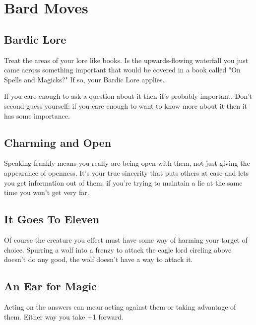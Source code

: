 \chapter{Bard Moves}
   
 
\section{Bardic Lore}    
 

Treat the areas of your lore like books. Is the upwards-flowing waterfall you just came across something important that would be covered in a book called "On Spells and Magicks?" If so, your Bardic Lore applies.

 

If you care enough to ask a question about it then it's probably important. Don't second guess yourself: if you care enough to want to know more about it then it has some importance.

 
\section{Charming and Open}   
 

Speaking frankly means you really are being open with them, not just giving the appearance of openness. It's your true sincerity that puts others at ease and lets you get information out of them; if you're trying to maintain a lie at the same time you won't get very far.

 
\section{It Goes To Eleven}   
 

Of course the creature you effect must have some way of harming your target of choice. Spurring a wolf into a frenzy to attack the eagle lord circling above doesn't do any good, the wolf doesn't have a way to attack it.

 
\section{An Ear for Magic}    
 

Acting on the answers can mean acting against them or taking advantage of them. Either way you take +1 forward.

 
